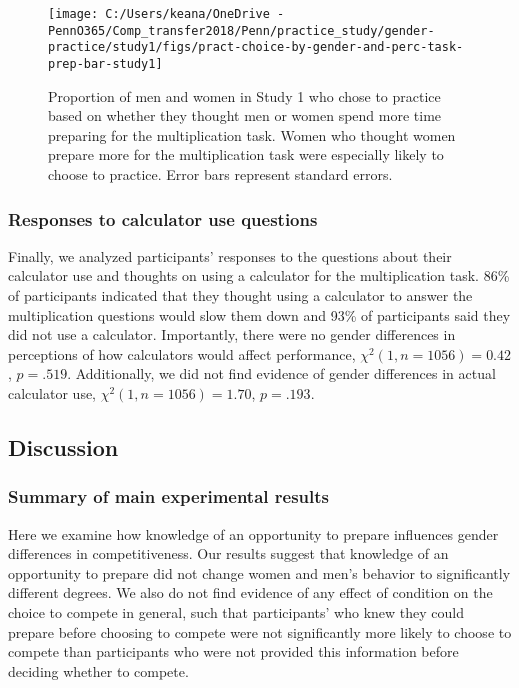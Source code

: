 \documentclass[letterpaper, nobind]{templates/ociamthesis}
\begin{document}
\begin{figure}

{\centering \texttt{[image: C:/Users/keana/OneDrive - PennO365/Comp\_transfer2018/Penn/practice\_study/gender-practice/study1/figs/pract-choice-by-gender-and-perc-task-prep-bar-study1]} 

}

\caption{Proportion of men and women in Study 1 who chose to practice based on whether they thought men or women spend more time preparing for the multiplication task. Women who thought women prepare more for the multiplication task were especially likely to choose to practice. Error bars represent standard errors.}\label{fig:pract-choice-by-gender-and-perc-task-prep-bar-study1}
\end{figure}

\hypertarget{responses-to-calculator-use-questions}{%
\subsubsection{Responses to calculator use questions}\label{responses-to-calculator-use-questions}}

Finally, we analyzed participants' responses to the questions about their calculator use and thoughts on using a calculator for the multiplication task. 86\% of participants indicated that they thought using a calculator to answer the multiplication questions would slow them down and 93\% of participants said they did not use a calculator. Importantly, there were no gender differences in perceptions of how calculators would affect performance, \(\chi^2(1, n = 1056) = 0.42\), \(p = .519\). Additionally, we did not find evidence of gender differences in actual calculator use, \(\chi^2(1, n = 1056) = 1.70\), \(p = .193\).

\hypertarget{discussion}{%
\subsection{Discussion}\label{discussion}}

\hypertarget{summary-of-main-experimental-results}{%
\subsubsection{Summary of main experimental results}\label{summary-of-main-experimental-results}}

Here we examine how knowledge of an opportunity to prepare influences gender differences in competitiveness. Our results suggest that knowledge of an opportunity to prepare did not change women and men's behavior to significantly different degrees. We also do not find evidence of any effect of condition on the choice to compete in general, such that participants' who knew they could prepare before choosing to compete were not significantly more likely to choose to compete than participants who were not provided this information before deciding whether to compete.
\end{document}
